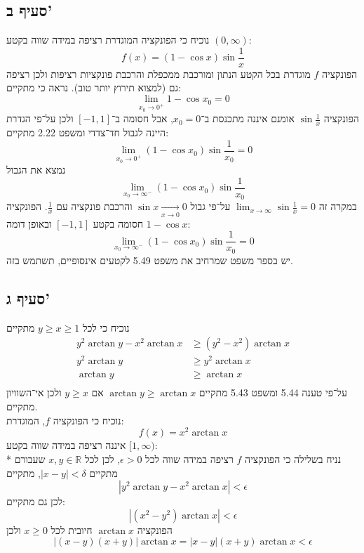 \documentclass[a4paper]{article}
\def\RR{\mathbb{R}}
\begin{document}
\subsection{סעיף ב'}
נוכיח כי הפונקציה המוגדרת רציפה במידה שווה בקטע $(0, \infty)$:
\[
	f(x) = (1 - \cos x) \sin \frac{1}{x}
\]
הפונקציה $f$ מוגדרת בכל הקטע הנתון ומורכבת ממכפלת והרכבת פונקציות רציפות ולכן רציפה גם (למצוא תירוץ יותר טוב).
נראה כי מתקיים:
\[
	\lim_{x_0 \to 0^+} 1 - \cos x_0 = 0
\]
הפונקציה $\sin \frac{1}{x}$ אומנם איננה מתכנסת ב־$x_0 = 0$, אבל חסומה ב־$[-1, 1]$ ולכן על־פי הגדרת היינה לגבול חד־צדדי ומשפט 2.22 מתקיים:
\[
	\lim_{x_0 \to 0^+} (1 - \cos x_0) \sin \frac{1}{x_0} = 0
\]
נמצא את הגבול
\[
	\lim_{x_0 \to \infty^-} (1 - \cos x_0) \sin \frac{1}{x_0}
\]
במקרה זה $\lim_{x \to \infty} \sin \frac{1}{x} = 0$ על־פי גבול $\sin x \underset{x \to 0}{\to} 0$ והרכבת פונקציה עם $\frac{1}{x}$.
הפונקציה $1 - \cos x$ חסומה בקטע $[-1, 1]$ ובאופן דומה:
\[
	\lim_{x_0 \to \infty^-} (1 - \cos x_0) \sin \frac{1}{x_0} = 0
\]
יש בספר משפט שמרחיב את משפט 5.49 לקטעים אינסופיים, תשתמש בזה.

\subsection{סעיף ג'}
נוכיח כי לכל $y \ge x \ge 1$ מתקיים
\begin{align*}
	y^2 \arctan y - x^2 \arctan x & \ge (y^2 - x^2) \arctan x \\
	y^2 \arctan y & \ge y^2 \arctan x \\
	\arctan y & \ge \arctan x \\
\end{align*}
על־פי טענה 5.44 ומשפט 5.43 מתקיים $\arctan y \ge \arctan x$ אם $y \ge x$ ולכן אי־השוויון מתקיים. \\
נוכיח כי הפונקציה $f$, המוגדרת:
\[
	f(x) = x^2 \arctan x
\]
איננה רציפה במידה שווה בקטע $[1, \infty)$: \\* %
נניח בשלילה כי הפונקציה $f$ רציפה במידה שווה לכל $\epsilon > 0$, לכן לכל $x, y \in \RR$ שעבורם מתקיים $|x - y| < \delta$, מתקיים
\[
	\left| y^2 \arctan y - x^2 \arctan x \right| < \epsilon
\]
לכן גם מתקיים:
\[
	\left| (x^2 - y^2) \arctan x \right| < \epsilon
\]
הפונקציה $\arctan x$ חיובית לכל $x \ge 0$ ולכן
\[
	\left| (x - y)(x + y) \right| \arctan x = \left| x - y \right| (x + y) \arctan x < \epsilon
\]
\end{document}
